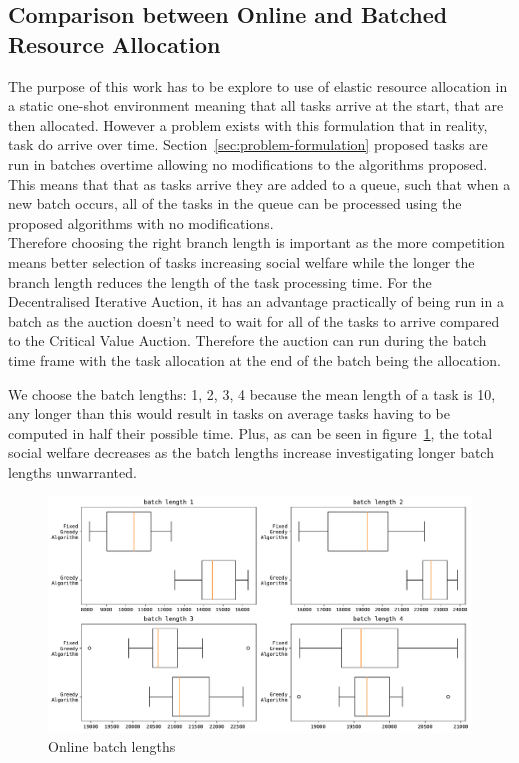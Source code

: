 \subsection{Comparison between Online and Batched Resource Allocation}
\label{subsec:comparison-between-online-and-batched-resource-allocation}
The purpose of this work has to be explore to use of elastic resource allocation in a static one-shot environment
meaning that all tasks arrive at the start, that are then allocated. However a problem exists with this formulation
that in reality, task do arrive over time. Section~\ref{sec:problem-formulation} proposed tasks are run in batches
overtime allowing no modifications to the algorithms proposed. This means that that as tasks arrive they are added to a
queue, such that when a new batch occurs, all of the tasks in the queue can be processed using the proposed algorithms
with no modifications. \\
Therefore choosing the right branch length is important as the more competition means better selection of tasks
increasing social welfare while the longer the branch length reduces the length of the task processing time. For the
Decentralised Iterative Auction, it has an advantage practically of being run in a batch as the auction doesn't need to
wait for all of the tasks to arrive compared to the Critical Value Auction. Therefore the auction can run during the
batch time frame with the task allocation at the end of the batch being the allocation.

We choose the batch lengths: 1, 2, 3, 4 because the mean length of a task is 10, any longer than this would result in
tasks on average tasks having to be computed in half their possible time. Plus, as can be seen in
figure~\ref{fig:batch-task-allocation}, the total social welfare decreases as the batch lengths increase investigating
longer batch lengths unwarranted.

\begin{figure}[h]
    \centering
    \includegraphics[width=\linewidth]{figs/online/online_batch_lengths.pdf}
    \caption{Online batch lengths}
    \label{fig:batch-task-allocation}
\end{figure}

